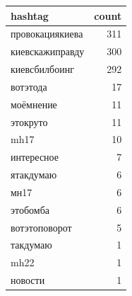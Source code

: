 \begin{tabular}{lr}
\toprule
hashtag & count \\
\midrule
провокациякиева & 311 \\
киевскажиправду & 300 \\
киевсбилбоинг & 292 \\
вотэтода & 17 \\
моёмнение & 11 \\
этокруто & 11 \\
mh17 & 10 \\
интересное & 7 \\
ятакдумаю & 6 \\
мн17 & 6 \\
этобомба & 6 \\
вотэтоповорот & 5 \\
такдумаю & 1 \\
mh22 & 1 \\
новости & 1 \\
\bottomrule
\end{tabular}
